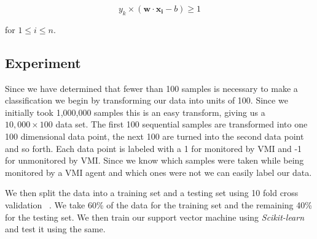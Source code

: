 \begin{equation}\label{SVMFinal}
	y_k \times (\bm{w}\cdot \bm{x_i} - b) \ge 1 
\end{equation}

for $1 \le i \le n$. 


\subsection{Experiment}

Since we have determined that fewer than 100 samples is necessary to make a classification we begin by transforming our data into units of 100. Since we initially took 1,000,000 samples this is an easy transform, giving us a $10,000 \times 100$ data set. The first 100 sequential samples are transformed into one 100 dimensional data point, the next 100 are turned into the second data point and so forth. Each data point is labeled with a 1 for monitored by VMI and -1 for unmonitored by VMI. Since we know which samples were taken while being monitored by a VMI agent and which ones were not we can easily label our data. 

We then split the data into a training set and a testing set using 10 fold cross validation ~\cite{bishop_pattern_2006}. We take 60\% of the data for the training set and the remaining 40\% for the testing set. We then train our support vector machine using \textit{Scikit-learn} and test it using the same.
